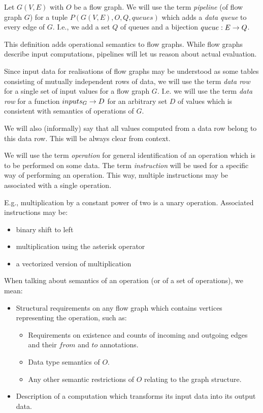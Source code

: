   Let $G(V,E)$ with $O$ be a flow graph. We will use the term \emph{pipeline} (of flow graph $G$) for a tuple $P(G(V,E), O, Q, queues)$ which adds a \emph{data queue} to every edge of $G$. I.e., we add a set $Q$ of queues and a bijection $queue: E \rightarrow Q$. 
\myenddef

This definition adds operational semantics to flow graphs. While flow graphs describe input computations, pipelines will let us reason about actual evaluation.


  Since input data for realisations of flow graphs may be understood as some tables consisting of mutually independent rows of data, we will use the term \emph{data row} for a single set of input values for a flow graph $G$. I.e. we will use the term \emph{data row} for a function $inputs_G \rightarrow D$ for an arbitrary set $D$ of values which is consistent with semantics of operations of $G$.

  We will also (informally) say that all values computed from a data row belong to this data row. This will be always clear from context.
\myenddef


We will use the term \emph{operation} for general identification of an operation which is to be performed on some data. The term \emph{instruction} will be used for a specific way of performing an operation. This way, multiple instructions may be associated with a single operation.
\myenddef

E.g., multiplication by a constant power of two is a unary operation. Associated instructions may be:
\begin{itemize}
  \item binary shift to left
  \item multiplication using the asterisk operator
  \item a vectorized version of multiplication
\end{itemize}

  When talking about semantics of an operation (or of a set of operations), we mean:
  \begin{itemize}
    \item Structural requirements on any flow graph which contains vertices representing the operation, such as:
    \begin{itemize}
      \item Requirements on existence and counts of incoming and outgoing edges and their $from$ and $to$ annotations.
      \item Data type semantics of $O$.
      \item Any other semantic restrictions of $O$ relating to the graph structure. 
    \end{itemize}
    \item Description of a computation which transforms its input data into its output data.
  \end{itemize}
\myenddef

